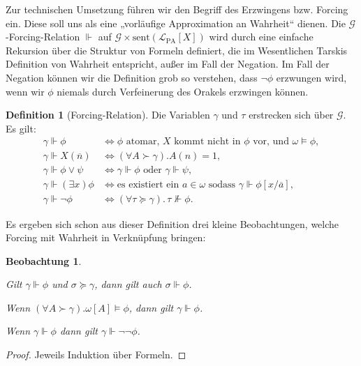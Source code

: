 \documentclass[nofonts]{uebung}
\newtheorem{observation}[theorem]{Beobachtung}
\theoremstyle{definition}
\newtheorem{definition}[theorem]{Definition}
\begin{document}
Zur technischen Umsetzung führen wir den Begriff des Erzwingens bzw. Forcing ein.
Diese soll uns als eine „vorläufige Approximation an Wahrheit“ dienen.
Die $\mathcal G$-Forcing-Relation $\Vdash$ auf $\mathcal G\times \mathrm{sent}(\mathcal L_{\mathrm{PA}}[X])$  wird durch eine einfache Rekursion über die Struktur von Formeln definiert, die im Wesentlichen Tarskis Definition von Wahrheit entspricht, außer im Fall der Negation.  Im Fall der Negation können wir die Definition grob so verstehen, dass $\neg\phi$ erzwungen wird, wenn wir $\phi$ niemals durch Verfeinerung des Orakels erzwingen können.

\begin{definition}[Forcing-Relation]
Die Variablen $\gamma$ und $\tau$ erstrecken sich über $\mathcal G$. Es gilt:
\begin{align*}
    \gamma\Vdash\phi &\iff \text{$\phi$ atomar, $X$ kommt nicht in $\phi$ vor, und $\omega\vDash\phi$},\\
    \gamma\Vdash X(\overline n)&\iff(\forall A\succ\gamma).A(n)=1,\\
    \gamma\Vdash \phi\lor\psi &\iff\gamma\Vdash\phi\text{ oder } \gamma\Vdash \psi,\\
    \gamma\Vdash(\exists x)\phi &\iff \text{es existiert ein $a\in\omega$ sodass } \gamma\Vdash \phi[x/\overline{a}],\\
    \gamma\Vdash \neg\phi &\iff (\forall \tau\succeq \gamma).\,\tau\not\Vdash\phi.
\end{align*}
\end{definition}

Es ergeben sich schon aus dieser Definition drei kleine Beobachtungen, welche Forcing mit Wahrheit in Verknüpfung bringen:
\begin{observation}
    \begin{thmenum}
    \item \label{obs:forcing-extension} Gilt $\gamma\Vdash\phi$ und $\sigma\succeq \gamma$, dann gilt auch $\sigma\Vdash \phi$.
    \item \label{obs:forcing-by-universaity} Wenn $(\forall A\succ \gamma).\omega[A]\vDash\phi$, dann gilt $\gamma\Vdash\phi$.
    \item Wenn $\gamma\Vdash\phi$ dann gilt $\gamma\Vdash\neg\neg\phi$.
    \end{thmenum}
\end{observation}
\begin{proof}
    Jeweils Induktion über Formeln.
\end{proof}
\end{document}
